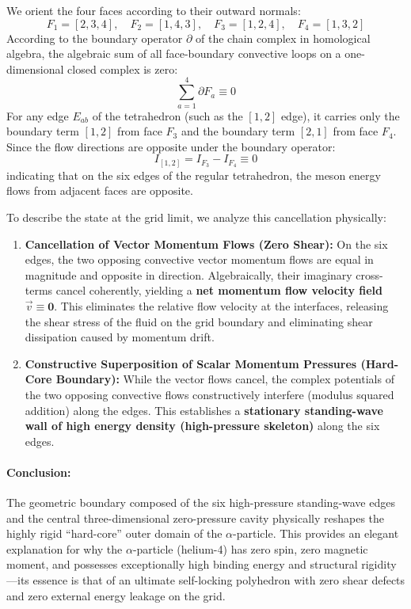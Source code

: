 \documentclass[12pt, a4paper]{article}
\begin{document}
We orient the four faces according to their outward normals:
\begin{equation}
F_1 = [2, 3, 4], \quad F_2 = [1, 4, 3], \quad F_3 = [1, 2, 4], \quad F_4 = [1, 3, 2]
\end{equation}
According to the boundary operator $\partial$ of the chain complex in homological algebra, the algebraic sum of all face-boundary convective loops on a one-dimensional closed complex is zero:
\begin{equation}
\sum_{a=1}^4 \partial F_a \equiv 0
\end{equation}
For any edge $E_{ab}$ of the tetrahedron (such as the $[1,2]$ edge), it carries only the boundary term $[1,2]$ from face $F_3$ and the boundary term $[2,1]$ from face $F_4$. Since the flow directions are opposite under the boundary operator:
\begin{equation}
I_{[1,2]} = I_{F_3} - I_{F_4} \equiv 0
\end{equation}
indicating that on the six edges of the regular tetrahedron, the meson energy flows from adjacent faces are opposite.

To describe the state at the grid limit, we analyze this cancellation physically:
\begin{enumerate}
    \item \textbf{Cancellation of Vector Momentum Flows (Zero Shear):} On the six edges, the two opposing convective vector momentum flows are equal in magnitude and opposite in direction. Algebraically, their imaginary cross-terms cancel coherently, yielding a \textbf{net momentum flow velocity field $\vec{v} \equiv \mathbf{0}$}. This eliminates the relative flow velocity at the interfaces, releasing the shear stress of the fluid on the grid boundary and eliminating shear dissipation caused by momentum drift.
    \item \textbf{Constructive Superposition of Scalar Momentum Pressures (Hard-Core Boundary):} While the vector flows cancel, the complex potentials of the two opposing convective flows constructively interfere (modulus squared addition) along the edges. This establishes a \textbf{stationary standing-wave wall of high energy density (high-pressure skeleton)} along the six edges.
\end{enumerate}

\paragraph{Conclusion:}
The geometric boundary composed of the six high-pressure standing-wave edges and the central three-dimensional zero-pressure cavity physically reshapes the highly rigid ``hard-core'' outer domain of the $\alpha$-particle. This provides an elegant explanation for why the $\alpha$-particle (helium-4) has zero spin, zero magnetic moment, and possesses exceptionally high binding energy and structural rigidity—its essence is that of an ultimate self-locking polyhedron with zero shear defects and zero external energy leakage on the grid.
\end{document}

